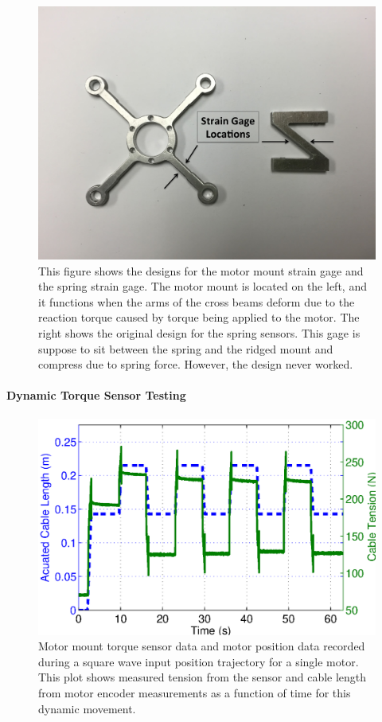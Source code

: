 \begin{appendices}
\begin{figure}[thpb]
      \centering
      \includegraphics[width=0.8\columnwidth]{tex/img/strain_gages}
      \caption{This figure shows the designs for the motor mount strain gage and the spring strain gage. The motor mount is located on the left, and it functions when the arms of the cross beams deform due to the reaction torque caused by torque being applied to the motor. The right shows the original design for the spring sensors. This gage is suppose to sit between the spring and the ridged mount and compress due to spring force. However, the design never worked.}
      \label{fig:force_sensors}
\end{figure}

\paragraph{Dynamic Torque Sensor Testing}
\begin{figure}[thpb]
      \centering
      \includegraphics[width=0.8\columnwidth]{tex/img/ICRA2015_dynamic_sensor_test}
      \caption{Motor mount torque sensor data and motor position data recorded during a square wave input position trajectory for a single motor. This plot shows measured tension from the sensor and cable length from motor encoder measurements as a function of time for this dynamic movement.}
      \label{fig:sensor1data}
\end{figure}


\end{appendices}
